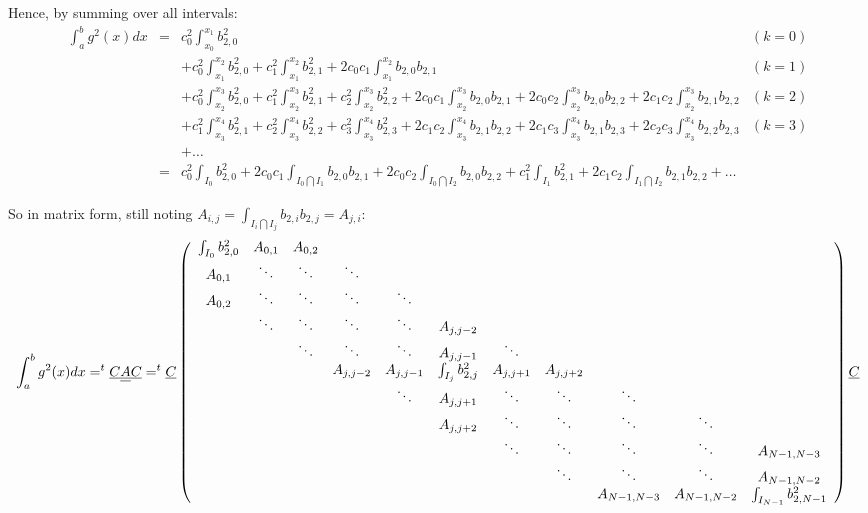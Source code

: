 \documentclass[paper=a4, fontsize=11pt]{book}
\numberwithin{equation}{section}		%
\numberwithin{figure}{section}			%
\numberwithin{table}{section}				%
\begin{document}
\begin{landscape}
Hence, by summing over all intervals:
$$
\begin{array}{llll}
\int_{a}^{b} g^2(x)dx & = & c_{0}^2\int_{x_0}^{x_{1}}b_{2,0}^2 & (k=0)\\
&& + c_{0}^2\int_{x_1}^{x_{2}}b_{2,0}^2 + c_{1}^2\int_{x_1}^{x_{2}}b_{2,1}^2 + 2c_{0}c_{1}\int_{x_1}^{x_{2}}b_{2,0}b_{2,1} & (k=1)\\
&& + c_{0}^2\int_{x_2}^{x_{3}}b_{2,0}^2 + c_{1}^2\int_{x_2}^{x_{3}}b_{2,1}^2 + c_{2}^2\int_{x_2}^{x_{3}}b_{2,2}^2 + 2c_{0}c_{1}\int_{x_2}^{x_{3}}b_{2,0}b_{2,1} + 2c_{0}c_{2}\int_{x_2}^{x_{3}}b_{2,0}b_{2,2} + 2c_{1}c_{2}\int_{x_2}^{x_{3}}b_{2,1}b_{2,2} & (k=2)\\
&& + c_{1}^2\int_{x_3}^{x_{4}}b_{2,1}^2 + c_{2}^2\int_{x_3}^{x_{4}}b_{2,2}^2 + c_{3}^2\int_{x_3}^{x_{4}}b_{2,3}^2 + 2c_{1}c_{2}\int_{x_3}^{x_{4}}b_{2,1}b_{2,2} + 2c_{1}c_{3}\int_{x_3}^{x_{4}}b_{2,1}b_{2,3} + 2c_{2}c_{3}\int_{x_3}^{x_{4}}b_{2,2}b_{2,3} & (k=3)\\
&& + \hdots &\\
& = & c_{0}^2\int_{I_0}b_{2,0}^2 + 2c_{0}c_{1}\int_{I_0\bigcap I_1}b_{2,0}b_{2,1} + 2c_{0}c_{2}\int_{I_0\bigcap I_2}b_{2,0}b_{2,2} + c_{1}^2\int_{I_1}b_{2,1}^2 + 2c_{1}c_{2}\int_{I_1\bigcap I_2}b_{2,1}b_{2,2} + \hdots&
\end{array}
$$


So in matrix form, still noting $A_{i,j} = \int_{I_i\bigcap I_j}b_{2,i}b_{2,j} = A_{j,i}$:
$$
\int_{a}^{b} g^2(x)dx = ^t\underline{C}\underline{\underline{A}}\underline{C} = ^t\underline{C} \left(\begin{array}{ccccccccccc}
\int_{I_0}b_{2,0}^2&A_{0,1}&A_{0,2}&&&&&&&&\\ A_{0,1}&\ddots&\ddots&\ddots&&&&&&&\\ A_{0,2}&\ddots&\ddots&\ddots&\ddots&&&&&&\\
&\ddots&\ddots&\ddots&\ddots&A_{j,j-2}&&&&&\\ &&\ddots&\ddots&\ddots&A_{j,j-1}&\ddots&&&&\\
&&&A_{j,j-2}&A_{j,j-1}&\int_{I_j}b_{2,j}^2&A_{j,j+1}&A_{j,j+2}&&&\\
&&&&\ddots&A_{j,j+1}&\ddots&\ddots&\ddots&&\\ &&&&&A_{j,j+2}&\ddots&\ddots&\ddots&\ddots&\\
&&&&&&\ddots&\ddots&\ddots&\ddots&A_{N-1,N-3}\\ &&&&&&&\ddots&\ddots&\ddots&A_{N-1,N-2}\\ &&&&&&&&A_{N-1,N-3}&A_{N-1,N-2}&\int_{I_{N-1}}b_{2,N-1}^2
\end{array}\right) \underline{C}\\
$$


\end{landscape}
\end{document}
